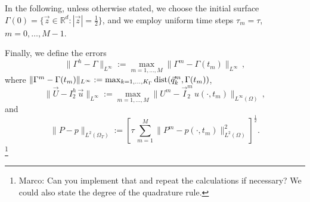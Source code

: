 \documentclass[a4paper,12pt,onecolumn]{article}
\newcommand{\R}{{\mathbb R}}
\newcommand{\errorXx}{\|\Gamma^h - \Gamma\|_{L^\infty}}
\newcommand{\errorUu}[1]{\|\vec U - I^h_{#1}\,\vec u\|_{L^\infty}}
\newcommand{\LerrorPp}{\|P - p\|_{L^2(\Omega_T)}}
\begin{document}
In the following, unless otherwise stated, we choose the initial surface 
$\Gamma(0) = \{ \vec z \in \R^d : |\vec z| = \frac12 \}$, and we employ 
uniform time steps $\tau_m=\tau$, $m=0,\ldots, M-1$.

Finally, we define the errors 
\begin{equation} \label{eq:errorXx}
\errorXx := \max_{m=1,\ldots, M} \|\Gamma^m - \Gamma(t_m)\|_{L^\infty}\,, 
\end{equation}
where $\|\Gamma^m - \Gamma(t_m)\|_{L^\infty} := 
\max_{k=1,\ldots, K_\Gamma} {\rm dist}( \vec{q}^m_k, \Gamma(t_m))$,
\begin{equation*} 
\errorUu2 := \max_{m=1,\ldots, M}\|U^m - \vec I^m_2\,u(\cdot,t_m)\|_{L^\infty(\Omega)}\,, 
\end{equation*}
and
\begin{equation*}
\LerrorPp := \left[\tau\,\sum_{m=1}^M \|P^m - p(\cdot,t_m)\|_{L^2(\Omega)}^2 
\right]^\frac12 .
\end{equation*}
\footnote{Marco: Can you implement that and repeat the calculations if necessary? We could also state the degree of the quadrature rule.}
\end{document}
